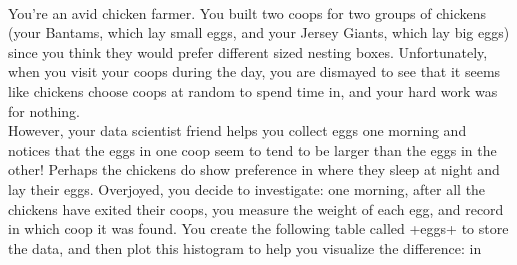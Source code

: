 \\[10pt]
You're an avid chicken farmer. You built two coops for two groups of chickens (your Bantams, which lay small eggs, and your Jersey Giants, which lay big eggs) since you think they would prefer different sized nesting boxes. Unfortunately, when you visit your coops during the day, you are dismayed to see that it seems like chickens choose coops at random to spend time in, and your hard work was for nothing.\\[5pt]
However, your data scientist friend helps you collect eggs one morning and notices that the eggs in one coop seem to tend to be larger than the eggs in the other! Perhaps the chickens do show preference in where they sleep at night and lay their eggs. Overjoyed, you decide to investigate: one morning, after all the chickens have exited their coops, you measure the weight of each egg, and record in which coop it was found. 
You create the following table called \lsi+eggs+ to store the data, and then plot this histogram to help you visualize the difference:
 in
